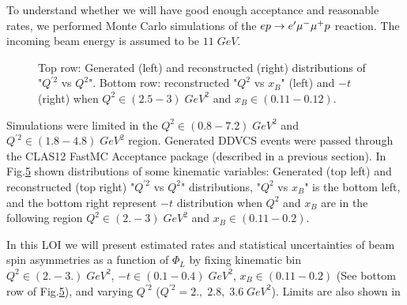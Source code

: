 
To understand whether we will have good enough acceptance and reasonable rates, we performed Monte Carlo simulations 
of the $ep\rightarrow e^{\prime}\mu^{-}\mu^{+}p$ reaction. The incoming beam energy is assumed to be $11 \; GeV$.
\begin{figure}[!htb]
 \centering
 \begin{subfigure}{0.48 \tw}
  \caption{}
  \label{fig:Qp2_Q2_gen_general2}
 \end{subfigure}
 \begin{subfigure}{0.48 \tw}
  \caption{}
  \label{fig:Qp2_Q2_rec_general2}
 \end{subfigure}
\begin{subfigure}{0.48 \tw}
  \caption{}
  \label{fig:Q2_xB_smear2}
 \end{subfigure}
 \begin{subfigure}{0.48 \tw}
  \caption{}
  \label{fig:tM_smear4}
 \end{subfigure}
 \caption{Top row: Generated (left) and reconstructed (right) distributions of "$Q^{\prime 2}$ vs $Q^{2}$".
 Bottom row: reconstructed "$Q^{2}$ vs $x_{B}$" (left) and $-t$ (right) when  $Q^{2} \in(2.5 - 3)\;GeV^{2}$ and $x_{B}\in(0.11 - 0.12)$.}
 \label{fig:kinematics_general}

\end{figure}
Simulations were limited in the $Q^{2}\in(0.8-7.2)\;GeV^{2}$ and $Q^{\prime 2}\in(1.8-4.8)\;GeV^{2}$ region.
Generated DDVCS events were passed through the CLAS12 FastMC Acceptance package (described in a previous section).
In Fig.\ref{fig:kinematics_general} shown distributions of some kinematic variables: Generated (top left) and reconstructed (top right) 
"$Q^{\prime 2}$ vs $Q^{2}$" distributions, "$Q^{2}$ vs $x_{B}$" is the bottom left, and the bottom right represent $-t$ distribution 
when $Q^{2}$ and $x_{B}$ are in the following region $Q^{2} \in(2. - 3)\;GeV^{2}$ and $x_{B}\in(0.11 - 0.2)$.

In this LOI we will present estimated rates and statistical uncertainties of beam spin asymmetries as a function of
$\Phi_{L}$ by fixing kinematic bin $Q^{2} \in(2. - 3.)\;GeV^{2}$, $-t\in (0.1 - 0.4)\; GeV^{2}$, $x_{B}\in(0.11 - 0.2)$ (See 
bottom row of Fig.\ref{fig:kinematics_general}), and 
varying $Q^{\prime 2}$ ($Q^{\prime 2} = {2.,\; 2.8,\;  3.6} \;GeV^{2}$). Limits are also shown in 


